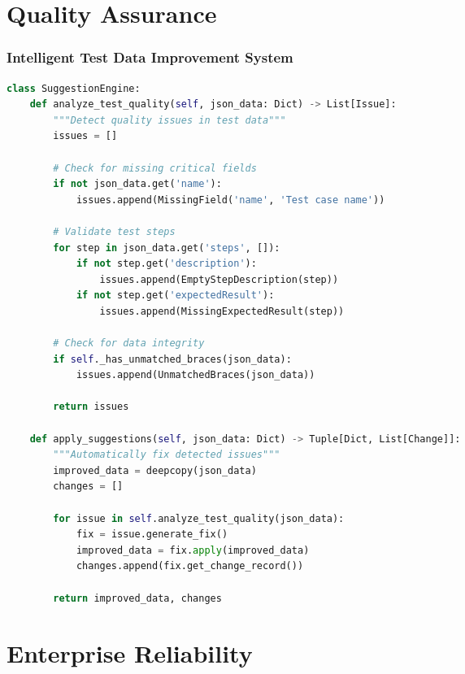 \section{Quality Assurance}
\begin{frame}[fragile,t]
\frametitle{Intelligent Test Data Improvement System}
\begin{adjustbox}{max width=\textwidth, max height=\textheight,keepaspectratio}
\begin{lstlisting}[language=Python,basicstyle=\fontsize{5}{6}\selectfont\ttfamily]
class SuggestionEngine:
    def analyze_test_quality(self, json_data: Dict) -> List[Issue]:
        """Detect quality issues in test data"""
        issues = []

        # Check for missing critical fields
        if not json_data.get('name'):
            issues.append(MissingField('name', 'Test case name'))

        # Validate test steps
        for step in json_data.get('steps', []):
            if not step.get('description'):
                issues.append(EmptyStepDescription(step))
            if not step.get('expectedResult'):
                issues.append(MissingExpectedResult(step))

        # Check for data integrity
        if self._has_unmatched_braces(json_data):
            issues.append(UnmatchedBraces(json_data))

        return issues

    def apply_suggestions(self, json_data: Dict) -> Tuple[Dict, List[Change]]:
        """Automatically fix detected issues"""
        improved_data = deepcopy(json_data)
        changes = []

        for issue in self.analyze_test_quality(json_data):
            fix = issue.generate_fix()
            improved_data = fix.apply(improved_data)
            changes.append(fix.get_change_record())

        return improved_data, changes
\end{lstlisting}
\end{adjustbox}
\end{frame}

\section{Enterprise Reliability}

